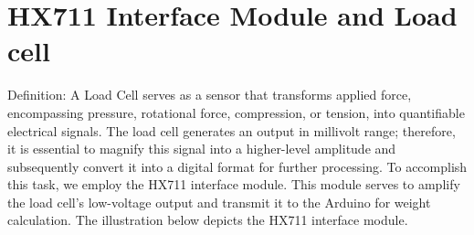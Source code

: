 \documentclass[../report.tex]{subfiles}
\begin{document}
\maketitle

\section*{HX711 Interface Module and Load cell}

Definition: A Load Cell serves as a sensor that transforms applied force, encompassing pressure, rotational force, compression, or tension, into quantifiable electrical signals.
The load cell generates an output in millivolt range; therefore, it is essential to magnify this signal into a higher-level amplitude and subsequently convert it into a digital format for further processing.
To accomplish this task, we employ the HX711 interface module. This module serves to amplify the load cell's low-voltage output and transmit it to the Arduino for weight calculation. 
The illustration below depicts the HX711 interface module.
\end{document}
